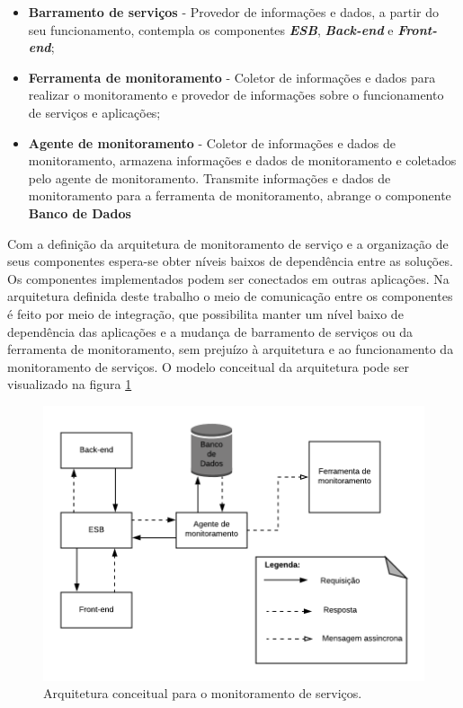 \begin{itemize}
    \item \textbf{Barramento de serviços} - Provedor de informações e dados, a partir do seu funcionamento, contempla os componentes \textbf{\textit{\acrshort{ESB}}}, \textbf{\textit{Back-end}} e \textbf{\textit{Front-end}}; 
    \item \textbf{Ferramenta de monitoramento} - Coletor de informações e dados para realizar o monitoramento e provedor de informações sobre o funcionamento de serviços e aplicações; 
    \item \textbf{Agente de monitoramento} - Coletor de informações e dados de monitoramento, armazena informações e dados de monitoramento e coletados pelo agente de monitoramento. Transmite informações e dados de monitoramento para a ferramenta de monitoramento, abrange o componente \textbf{Banco de Dados}
\end{itemize}

Com a definição da arquitetura de monitoramento de serviço e a organização de seus componentes espera-se obter níveis baixos de dependência entre as soluções. Os componentes implementados podem ser conectados em outras aplicações. Na arquitetura definida deste trabalho o meio de comunicação entre os componentes é feito por meio de integração, que possibilita manter um nível baixo de dependência das aplicações e a mudança de barramento de serviços ou da ferramenta de monitoramento, sem prejuízo à arquitetura e ao funcionamento da monitoramento de serviços. O modelo conceitual da arquitetura pode ser visualizado na figura \ref{fun:fig:arquitetura_conceitual_monitoramento}

\begin{figure}[h!]
	\begin{center}
	\includegraphics[scale = 0.55]{img/Arquitetura_Proposta_Monitoramento.png}
		\caption{Arquitetura conceitual para o monitoramento de serviços.}
		\label{fun:fig:arquitetura_conceitual_monitoramento}
	\end{center}
\end{figure}

